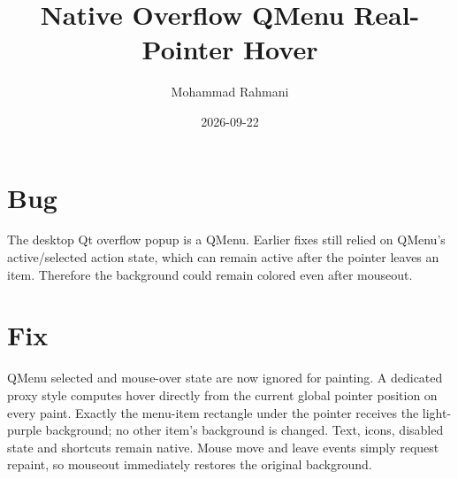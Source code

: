 \documentclass[a4paper]{article}
\title{Native Overflow QMenu Real-Pointer Hover}
\date{2026-09-22}
\author{Mohammad Rahmani}
\begin{document}
   \maketitle

   \begin{preview}
      \section{Bug}
      The desktop Qt overflow popup is a QMenu.  Earlier fixes still relied on
      QMenu's active/selected action state, which can remain active after the
      pointer leaves an item.  Therefore the background could remain colored
      even after mouseout.

      \section{Fix}
      QMenu selected and mouse-over state are now ignored for painting.  A
      dedicated proxy style computes hover directly from the current global
      pointer position on every paint.  Exactly the menu-item rectangle under
      the pointer receives the light-purple background; no other item's
      background is changed.  Text, icons, disabled state and shortcuts remain
      native.  Mouse move and leave events simply request repaint, so mouseout
      immediately restores the original background.
   \end{preview}

   
   
\end{document}
